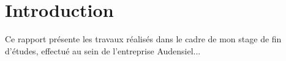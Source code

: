 \chapter*{Introduction}

Ce rapport présente les travaux réalisés dans le cadre de mon stage de fin d’études, effectué au sein de l’entreprise Audensiel...
